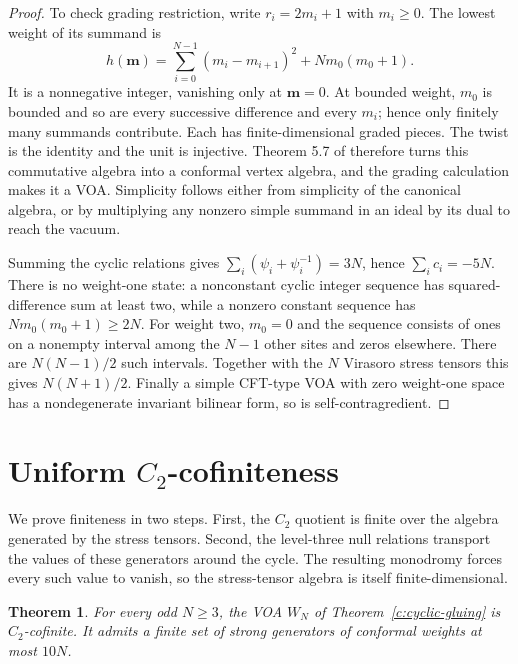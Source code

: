 \documentclass[11pt,a4paper]{article}
\numberwithin{equation}{section}
\newtheorem{theorem}{Theorem}[section]
\theoremstyle{definition}\newtheorem{definition}[theorem]{Definition}
\theoremstyle{remark}\newtheorem{remark}[theorem]{Remark}
\begin{document}
\begin{proof}
To check grading restriction, write $r_i=2m_i+1$ with $m_i\ge0$. The lowest weight of its summand is
\begin{equation}\label{c:chain-weight}
 h(\mathbf m)=\sum_{i=0}^{N-1}(m_i-m_{i+1})^2+Nm_0(m_0+1).
\end{equation}
It is a nonnegative integer, vanishing only at $\mathbf m=0$. At bounded weight, $m_0$ is bounded and so are every successive difference and every $m_i$; hence only finitely many summands contribute. Each has finite-dimensional graded pieces. The twist is the identity and the unit is injective. Theorem 5.7 of \cite{gluing} therefore turns this commutative algebra into a conformal vertex algebra, and the grading calculation makes it a VOA. Simplicity follows either from simplicity of the canonical algebra, or by multiplying any nonzero simple summand in an ideal by its dual to reach the vacuum.

Summing the cyclic relations gives $\sum_i(\psi_i+\psi_i^{-1})=3N$, hence $\sum_i c_i=-5N$. There is no weight-one state: a nonconstant cyclic integer sequence has squared-difference sum at least two, while a nonzero constant sequence has $Nm_0(m_0+1)\ge2N$. For weight two, $m_0=0$ and the sequence consists of ones on a nonempty interval among the $N-1$ other sites and zeros elsewhere. There are $N(N-1)/2$ such intervals. Together with the $N$ Virasoro stress tensors this gives $N(N+1)/2$. Finally a simple CFT-type VOA with zero weight-one space has a nondegenerate invariant bilinear form, so is self-contragredient.
\end{proof}


\section{Uniform \texorpdfstring{$C_2$}{C2}-cofiniteness}\label{c:app:c2}
We prove finiteness in two steps. First, the $C_2$ quotient is finite
over the algebra generated by the stress tensors. Second, the
level-three null relations transport the values of these generators
around the cycle. The resulting monodromy forces every such value
to vanish, so the stress-tensor algebra is itself finite-dimensional.

\begin{theorem}\label{c:cyclic-c2}
For every odd $N\ge3$, the VOA $W_N$ of
Theorem~\ref{c:cyclic-gluing} is $C_2$-cofinite. It admits a finite set
of strong generators of conformal weights at most $10N$.
\end{theorem}
\end{document}
